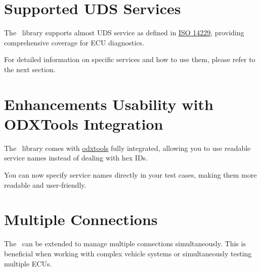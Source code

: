 \section{Supported UDS Services}
The \pkg\ library supports almost UDS service as defined in 
\href{https://automotive.wiki/index.php/ISO_14229}{ISO 14229}, 
providing comprehensive coverage for ECU diagnostics.

For detailed information on specific services and how to use them, please refer 
to the next section.

\section{Enhancements Usability with ODXTools Integration}
The \pkg\ library comes with 
\href{https://github.com/mercedes-benz/odxtools}{odxtools} fully integrated, 
allowing you to use readable service names instead of dealing with hex IDs.

You can now specify service names directly in your test cases, 
making them more readable and user-friendly.

\section{Multiple Connections}
The \pkg\ can be extended to manage multiple connections simultaneously.
This is beneficial when working with complex vehicle systems or simultaneously
testing multiple ECUs.

